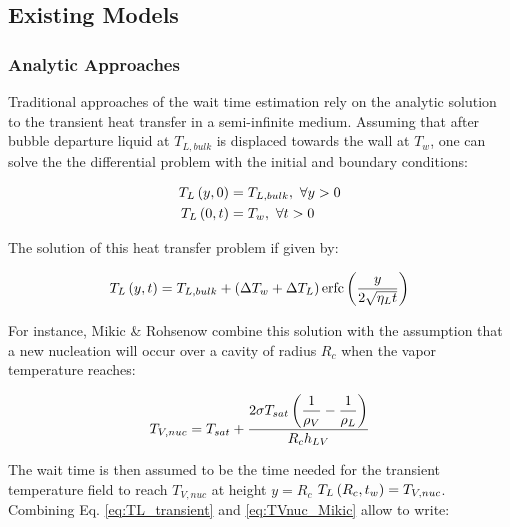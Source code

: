 \subsection{Existing Models}

\subsubsection{Analytic Approaches}

Traditional approaches of the wait time estimation rely on the analytic solution to the transient heat transfer in a semi-infinite medium. Assuming that after bubble departure liquid at $T_{L,bulk}$ is displaced towards the wall at $T_{w}$, one can solve the the differential problem with the initial and boundary conditions:

\begin{align}
T_{L}\left( y,0 \right) &= T_{L,bulk},\ \forall y >0\\
T_{L}\left( 0,t \right) &= T_{w},\ \forall t > 0
\end{align}


The solution of this heat transfer problem if given by:


\begin{equation}
T_{L}\left( y,t \right) = T_{L,bulk} + \left( \Delta T_{w} + \Delta T_{L} \right)\mathrm{erfc}\left( \frac{y}{2\sqrt{\eta_{L}t}} \right)
\label{eq:TL_transient}
\end{equation}

For instance, Mikic \& Rohsenow \cite{mikic_bubble_1970} combine this solution with the assumption that a new nucleation will occur over a cavity of radius $R_{c}$ when the vapor temperature reaches:

\begin{equation}
T_{V,nuc} = T_{sat} + \frac{2\sigma T_{sat} \left( \dfrac{1}{\rho_{V}} - \dfrac{1}{\rho_{L}}  \right)}{R_{c}h_{LV}}
\label{eq:TVnuc_Mikic} 
\end{equation} 

The wait time is then assumed to be the time needed for the transient temperature field to reach $T_{V,nuc}$ at height $y=R_{c}$ \ie $T_{L}\left( R_{c},t_{w} \right)=T_{V,nuc}$. Combining Eq. \ref{eq:TL_transient} and \ref{eq:TVnuc_Mikic} allow to write:

